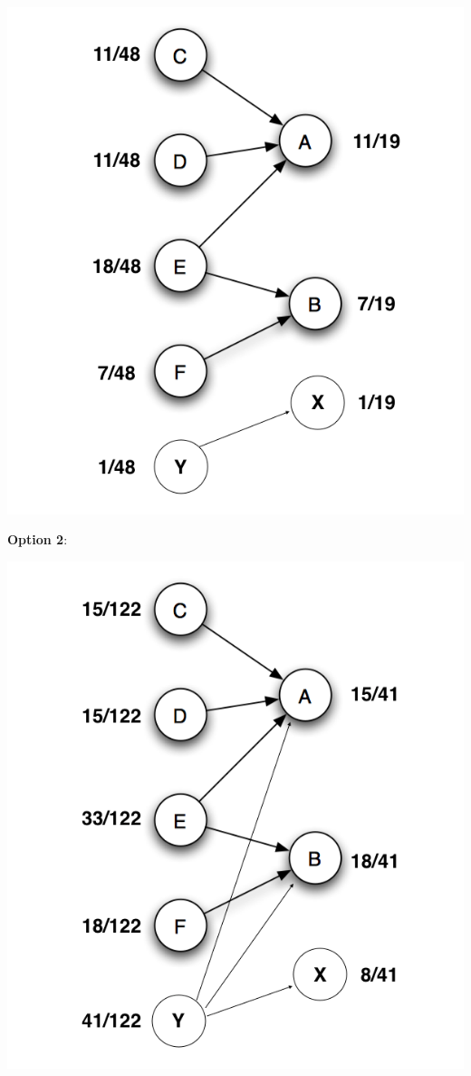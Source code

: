 \documentclass[a4paper]{article}
\begin{document}
\begin{center}
  \includegraphics[scale=0.5]{fig4-op1.png}
\end{center}

\textbf{Option 2}:

\begin{center}
  \includegraphics[scale=0.5]{fig4-op2.png}
\end{center}
\end{document}
